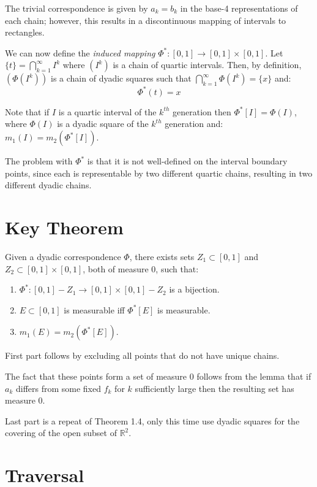 \documentclass[letterpaper,12pt,fleqn]{article}
\newcommand{\uint}{[0,1]}
\newcommand{\usq}{\uint\times\uint}
\begin{document}
The trivial correspondence is given by $a_k=b_k$ in the base-4 representations
of each chain; however, this results in a discontinuous mapping of intervals
to rectangles.

We can now define the \emph{induced mapping} $\Phi^*:\uint\to\usq$. Let
$\{t\}=\bigcap_{k=1}^{\infty}I^k$ where $(I^k)$ is a chain of quartic intervals.
Then, by definition, $(\Phi(I^k))$ is a chain of dyadic squares such that
$\bigcap_{k=1}^{\infty}\Phi(I^k)=\{x\}$ and:
\[\Phi^*(t)=x\]

Note that if $I$ is a quartic interval of the $k^{th}$ generation then
$\Phi^*[I]=\Phi(I)$, where $\Phi(I)$ is a dyadic square of the $k^{th}$
generation and: $m_1(I)=m_2(\Phi^*[I])$.

The problem with $\Phi^*$ is that it is not well-defined on the interval
boundary points, since each is representable by two different quartic chains,
resulting in two different dyadic chains.

\newpage

\section*{Key Theorem}

\begin{theorem}
Given a dyadic correspondence $\Phi$, there exists sets $Z_1\subset\uint$ and
$Z_2\subset\usq$, both of measure 0, such that:
\begin{enumerate}
\item $\Phi^*:\uint-Z_1\to\usq-Z_2$ is a bijection.
\item $E\subset\uint$ is measurable iff $\Phi^*[E]$ is measurable.
\item $m_1(E)=m_2(\Phi^*[E])$.
\end{enumerate}
\end{theorem}

First part follows by excluding all points that do not have unique chains.

The fact that these points form a set of measure 0 follows from the lemma that
if $a_k$ differs from some fixed $f_k$ for $k$ sufficiently large then the
resulting set has measure 0.

Last part is a repeat of Theorem 1.4, only this time use dyadic squares for
the covering of the open subset of $\mathbb{R}^2$.

\newpage

\section*{Traversal}
\end{document}
